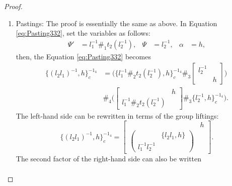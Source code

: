 \documentclass[11pt, reqno]{amsart} %
\newcommand{\act}[1]{\,\sp{#1}\!}
\theoremstyle{definition}
\theoremstyle{remark}
\numberwithin{equation}{section}
\begin{document}
\begin{proof}
\begin{enumerate}
\begin{align*}
    &= 
    \begin{pmatrix} & t_3(\act{h_w}\{h_z,h_y|h_x\})\\\{h_w,h_zh_y|h_x\} &\end{pmatrix}
    \#_4
    \act{h_w}\{h_z,h_y|h_x\},
  \end{align*}
  where we have used $t_3(\{h_3,h_2|h_1\}) = \{h_3h_2,h_1\}\{h_3,\act{\partial h_2}h_1\}^{-1}\act{h_3}\{h_2,h_1\}^{-1}$ in the parentheses. Since both sides are of the form $(m\#_3t_3(m'))\#_4m' = mm'$, we therefore obtain
  \[
    \{h_wh_z,h_y|h_x\}\act{\act{h_wh_z}\{h_y,h_x\}}\{h_w,h_z|\act{\partial h_y}h_x\} = \{h_w,h_zh_y|h_x\}\act{h_w}\{h_z,h_y|h_x\}.
  \]
  This is exactly Equation \eqref{eq:3-CM-Fund-left-Hom}.
  \setcounter{enumi}{8}
  \item Pastings: The proof is essentially the same as above. In Equation \eqref{eq:Pasting332}, set the variables as follows:
  \begin{align*}
    \Psi' &= l_1^{-1}\#_1t_2(l_2^{-1}), &
    \Psi &= l_2^{-1}, &
    \alpha &= h,
  \end{align*}
  then, the Equation \eqref{eq:Pasting332} becomes
  \begin{align}
    \nonumber
    \{(l_2l_1)^{-1},h\}_c^{-1_4}
    &= 
    \bigl(
      \{l_1^{-1}\#_2t_2(l_2^{-1}),h\}_c^{-1_4}
      \#_3
      \begin{bmatrix}l_2^{-1} & \\ & h\end{bmatrix}
    \bigr) \\
    \label{eq:piece0}
    & \#_4
    \bigl(
      \begin{bmatrix}& h \\ l_1^{-1}\#_2t_2(l_2^{-1}) &\end{bmatrix}
      \#_3
      \{l_2^{-1},h\}_c^{-1_4}
    \bigr).
  \end{align}
  The left-hand side can be rewritten in terms of the group liftings:
  \begin{equation}
    \label{eq:piece1}
    \{(l_2l_1)^{-1},h\}_c^{-1_4} = \begin{bmatrix}& h \\ \begin{pmatrix} & \{l_2l_1,h\} \\ l_1^{-1}l_2^{-1} & \end{pmatrix} & \end{bmatrix}.
  \end{equation}
  The second factor of the right-hand side can also be written
  \begin{align}

\end{align}
\end{enumerate}
\end{proof}
\end{document}
